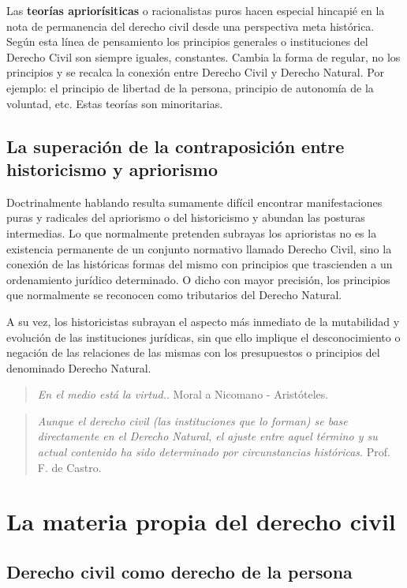 \documentclass[a4paper,12pt]{report}
\begin{document}
Las \textbf{teorías apriorísiticas} o racionalistas puros hacen especial
hincapié en la nota de permanencia del derecho civil desde una perspectiva meta
histórica. Según esta línea de pensamiento los principios generales o
instituciones del Derecho Civil son siempre iguales, constantes. Cambia la forma
de regular, no los principios y se recalca la conexión entre Derecho Civil y
Derecho Natural. Por ejemplo: el principio de libertad de la persona, principio
de autonomía de la voluntad, etc. Estas teorías son minoritarias.

\subsection{La superación de la contraposición entre historicismo y apriorismo}

Doctrinalmente hablando resulta sumamente difícil encontrar manifestaciones
puras y radicales del apriorismo o del historicismo y abundan las posturas
intermedias. Lo que normalmente pretenden subrayas los aprioristas no es la
existencia permanente de un conjunto normativo llamado Derecho Civil, sino la
conexión de las históricas formas del mismo con principios que trascienden a un
ordenamiento jurídico determinado. O dicho con mayor precisión, los principios
que normalmente se reconocen como tributarios del Derecho Natural.

A su vez, los historicistas subrayan el aspecto más inmediato de la mutabilidad
y evolución de las instituciones jurídicas, sin que ello implique el
desconocimiento o negación de las relaciones de las mismas con los presupuestos
o principios del denominado Derecho Natural.

\begin{quote}
    \textit{En el medio está la virtud.}. Moral a Nicomano - Aristóteles.
\end{quote}

\begin{quote}
    \textit{Aunque el derecho civil (las instituciones que lo forman) se base
    directamente en el Derecho Natural, el ajuste entre aquel término y su
actual contenido ha sido determinado por circunstancias históricas}. Prof. F. de
Castro.
\end{quote}
\section{La materia propia del derecho civil}
\subsection{Derecho civil como derecho de la persona}
\end{document}
